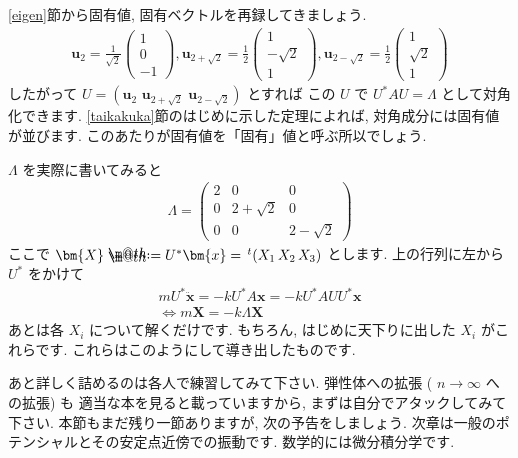 \documentclass[openany, a4paper, oneside]{book}
\makeatletter
\newcommand*{\defeq}{\mathrel{\rlap{%
\raisebox{0.3ex}{$\m@th\cdot$}}%
\raisebox{-0.3ex}{$\m@th\cdot$}}%
=}
\theoremstyle{break}
\theoremstyle{breakdefn}
\makeatother
\begin{document}
\ref{eigen}節から固有値, 固有ベクトルを再録してきましょう.
    \begin{align}
        \bm{u}_{2}
        =
        \frac{1}{\sqrt{2}} \begin{pmatrix} 1 \\ 0 \\ -1 \end{pmatrix} ,
        \bm{u}_{2 + \sqrt{2}}
        =
        \frac{1}{2} \begin{pmatrix} 1 \\ -\sqrt{2} \\ 1 \end{pmatrix} ,
        \bm{u}_{2 - \sqrt{2}}
        =
        \frac{1}{2} \begin{pmatrix} 1 \\ \sqrt{2} \\ 1 \end{pmatrix}
    \end{align}
したがって $U = (\bm{u}_2 \,\, \bm{u}_{2+\sqrt{2}} \,\, \bm{u}_{2-\sqrt{2}})$ とすれば
この $U$ で $U^{*}AU=\Lambda$ として対角化できます. \ref{taikakuka}節のはじめに示した定理によれば,
対角成分には固有値が並びます. このあたりが固有値を「固有」値と呼ぶ所以でしょう.

 $\Lambda$ を実際に書いてみると
    \begin{align}
        \Lambda = \begin{pmatrix} 2 & 0 & 0 \\
                                  0 & 2 + \sqrt{2} & 0 \\
                                  0 & 0 & 2 - \sqrt{2}
                  \end{pmatrix}
    \end{align}
ここで $\bm{X}\defeq U^{*}\bm{x}=\, ^{t} (X_1 \, X_2 \, X_3)$ とします. 上の行列に左から $U^{*}$ をかけて
    \begin{gather}
        mU^{*}\ddot{\bm{x}} = -k U^{*}A\bm{x} = -k U^{*}AUU^{*}\bm{x} \\
        \Longleftrightarrow
        m\bm{X} = -k \Lambda \bm{X}
    \end{gather}
あとは各 $X_i$ について解くだけです. もちろん, はじめに天下りに出した $X_i$ がこれらです.
これらはこのようにして導き出したものです.

あと詳しく詰めるのは各人で練習してみて下さい. 弾性体への拡張 ( $n \rightarrow \infty$ への拡張) も
適当な本を見ると載っていますから, まずは自分でアタックしてみて下さい.
本節もまだ残り一節ありますが, 次の予告をしましょう.
次章は一般のポテンシャルとその安定点近傍での振動です. 数学的には微分積分学です.
\end{document}
